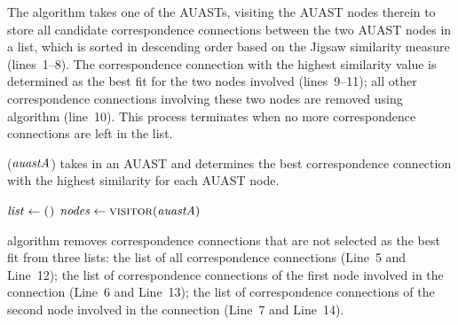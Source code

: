 The  algorithm takes one of the AUASTs, visiting the AUAST nodes therein to store all candidate correspondence connections between the two AUAST nodes in a list, which is sorted in descending order based on the Jigsaw similarity measure (lines~1--8). The correspondence connection with the highest similarity value is determined as the best fit for the two nodes involved (lines~9--11); all other correspondence connections involving these two nodes are removed using  algorithm (line~10). This process terminates when no more correspondence connections are left in the list.
\begin{algorithm}
\caption{($\mathit{auastA}$) takes in an AUAST and determines the best correspondence connection with the highest similarity for each AUAST node.}
\label{alg-determine}
\begin{algorithmic}[1]
\CreateList
    \State $\mathit{list} \gets \textsc{()}$
    \State $\mathit{nodes} \gets \textsc{visitor}(\mathit{auastA})$
	
			 	\EndFor  	
	   \EndFor		
	   \EndFor
  \end{algorithmic}
\end{algorithm}

 algorithm removes correspondence connections that are not selected as the best fit from three lists: the list of all correspondence connections (Line~5 and Line~12);
the list of correspondence connections of the first node involved in the connection (Line~6 and Line~13); the list of correspondence connections of the second node involved in the connection (Line~7 and Line~14).


